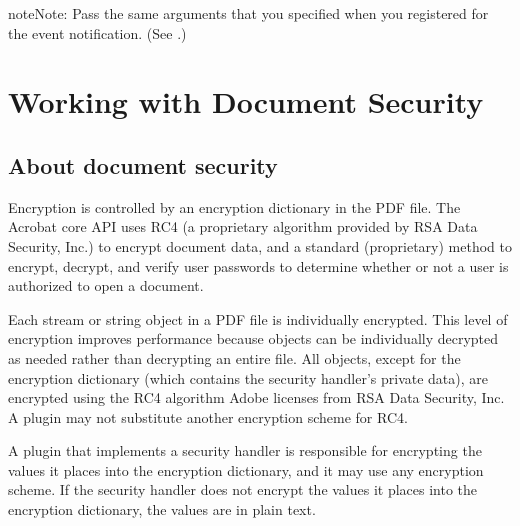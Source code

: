 \documentclass[letterpaper,12pt,english,openany,oneside]{sphinxmanual}
\begin{document}
\begin{sphinxVerbatim}[commandchars=\\\{\}]


 
\end{sphinxVerbatim}

\begin{sphinxadmonition}{note}{Note:}
Pass the same arguments that you specified when you registered for the event notification. (See .)
\end{sphinxadmonition}


\chapter{Working with Document Security}
\label{\detokenize{Plugins_Security:working-with-document-security}}\label{\detokenize{Plugins_Security::doc}}

\section{About document security}
\label{\detokenize{Plugins_Security:about-document-security}}
Encryption is controlled by an encryption dictionary in the PDF file. The Acrobat core API uses RC4 (a proprietary algorithm provided by RSA Data Security, Inc.) to encrypt document data, and a standard (proprietary) method to encrypt, decrypt, and verify user passwords to determine whether or not a user is authorized to open a document.

Each stream or string object in a PDF file is individually encrypted. This level of encryption improves performance because objects can be individually decrypted as needed rather than decrypting an entire file. All objects, except for the encryption dictionary (which contains the security handler’s private data), are encrypted using the RC4 algorithm Adobe licenses from RSA Data Security, Inc. A plugin may not substitute another encryption scheme for RC4.

A plugin that implements a security handler is responsible for encrypting the values it places into the encryption dictionary, and it may use any encryption scheme. If the security handler does not encrypt the values it places into the encryption dictionary, the values are in plain text.
\end{document}
